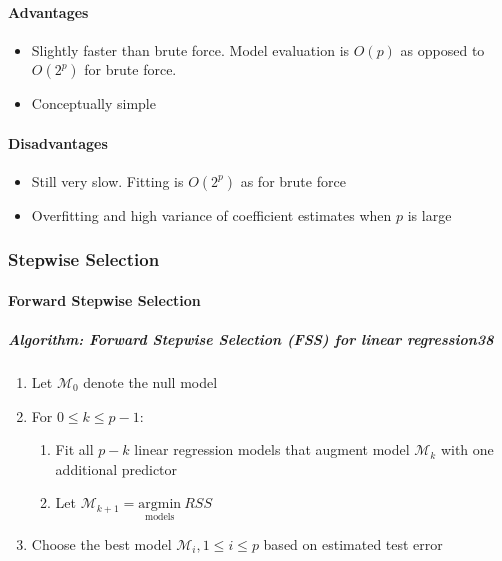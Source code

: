 \documentclass[11pt]{article}
\providecommand{\tightlist}{%
      \setlength{\itemsep}{0pt}\setlength{\parskip}{0pt}}
\begin{document}
    \hypertarget{advantages}{%
\paragraph{Advantages}\label{advantages}}

    \begin{itemize}
\tightlist
\item
  Slightly faster than brute force. Model evaluation is \(O(p)\) as
  opposed to \(O(2^p)\) for brute force.
\item
  Conceptually simple
\end{itemize}

    \hypertarget{disadvantages}{%
\paragraph{Disadvantages}\label{disadvantages}}

    \begin{itemize}
\tightlist
\item
  Still very slow. Fitting is \(O(2^p)\) as for brute force
\item
  Overfitting and high variance of coefficient estimates when \(p\) is
  large
\end{itemize}

    \hypertarget{stepwise-selection}{%
\subsubsection{Stepwise Selection}\label{stepwise-selection}}

    \hypertarget{forward-stepwise-selection}{%
\paragraph{Forward Stepwise
Selection}\label{forward-stepwise-selection}}

    \hypertarget{algorithm-forward-stepwise-selection-fss-for-linear-regression38}{%
\subparagraph{\texorpdfstring{Algorithm: \textbf{\emph{Forward Stepwise
Selection}} (FSS) for linear
regression38}{Algorithm: Forward Stepwise Selection (FSS) for linear regression38}}\label{algorithm-forward-stepwise-selection-fss-for-linear-regression38}}

    \begin{enumerate}
\def\labelenumi{\arabic{enumi}.}
\tightlist
\item
  Let \(\mathcal{M}_0\) denote the null model
\item
  For \(0 \leqslant k \leqslant p - 1\):

  \begin{enumerate}
  \def\labelenumii{\arabic{enumii}.}
  \tightlist
  \item
    Fit all \(p-k\) linear regression models that augment model
    \(\mathcal{M}_k\) with one additional predictor
  \item
    Let
    \(\mathcal{M}_{k+1} = \underset{\text{models}}{\text{argmin}}\ RSS\)
  \end{enumerate}
\item
  Choose the best model \(\mathcal{M}_i, 1 \leqslant i \leqslant p\)
  based on estimated test error
\end{enumerate}
\end{document}
